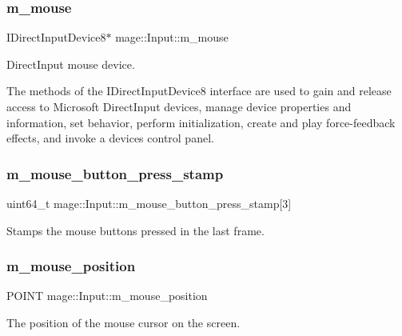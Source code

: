 \subsubsection{\texorpdfstring{m\+\_\+mouse}{m\_mouse}}
{\footnotesize\ttfamily I\+Direct\+Input\+Device8$\ast$ mage\+::\+Input\+::m\+\_\+mouse\hspace{0.3cm}{\ttfamily [private]}}

Direct\+Input mouse device.

The methods of the I\+Direct\+Input\+Device8 interface are used to gain and release access to Microsoft Direct\+Input devices, manage device properties and information, set behavior, perform initialization, create and play force-\/feedback effects, and invoke a device\textquotesingle{}s control panel. \hypertarget{classmage_1_1_input_accf558cd7da26ec27b24fde21627a07e}{}\label{classmage_1_1_input_accf558cd7da26ec27b24fde21627a07e} 
\subsubsection{\texorpdfstring{m\+\_\+mouse\+\_\+button\+\_\+press\+\_\+stamp}{m\_mouse\_button\_press\_stamp}}
{\footnotesize\ttfamily uint64\+\_\+t mage\+::\+Input\+::m\+\_\+mouse\+\_\+button\+\_\+press\+\_\+stamp\mbox{[}3\mbox{]}\hspace{0.3cm}{\ttfamily [private]}}

Stamps the mouse buttons pressed in the last frame. \hypertarget{classmage_1_1_input_a28b8ec250a8d0d0efe0da713060b8599}{}\label{classmage_1_1_input_a28b8ec250a8d0d0efe0da713060b8599} 
\subsubsection{\texorpdfstring{m\+\_\+mouse\+\_\+position}{m\_mouse\_position}}
{\footnotesize\ttfamily P\+O\+I\+NT mage\+::\+Input\+::m\+\_\+mouse\+\_\+position\hspace{0.3cm}{\ttfamily [private]}}

The position of the mouse cursor on the screen. \hypertarget{classmage_1_1_input_a14b8cf407e86724f900d2c4385461cfc}{}\label{classmage_1_1_input_a14b8cf407e86724f900d2c4385461cfc} 
